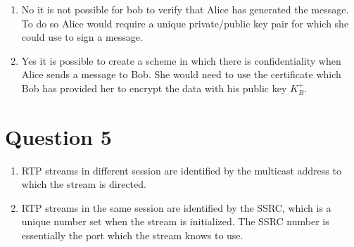 \documentclass[fleqn, 12pt]{article}
\begin{document}
\begin{enumerate}
    \item
        No it is not possible for bob to verify that Alice has generated the message. To do so Alice would require a unique private/public key pair for which she could use to sign a message.
    \item
        Yes it is possible to create a scheme in which there is confidentiality when Alice sends a message to Bob. She would need to use the certificate which Bob has provided her to encrypt the data with his public key $K_B^+$.

        \begin{center}
        \end{center}
\end{enumerate}

\section*{Question 5}

\begin{enumerate}
    \item
        RTP streams in different session are identified by the multicast address to which the stream is directed.
    \item
        RTP streams in the same session are identified by the SSRC, which is a unique number set when the stream is initialized. The SSRC number is essentially the port which the stream knows to use.
\end{enumerate}
\end{document}
